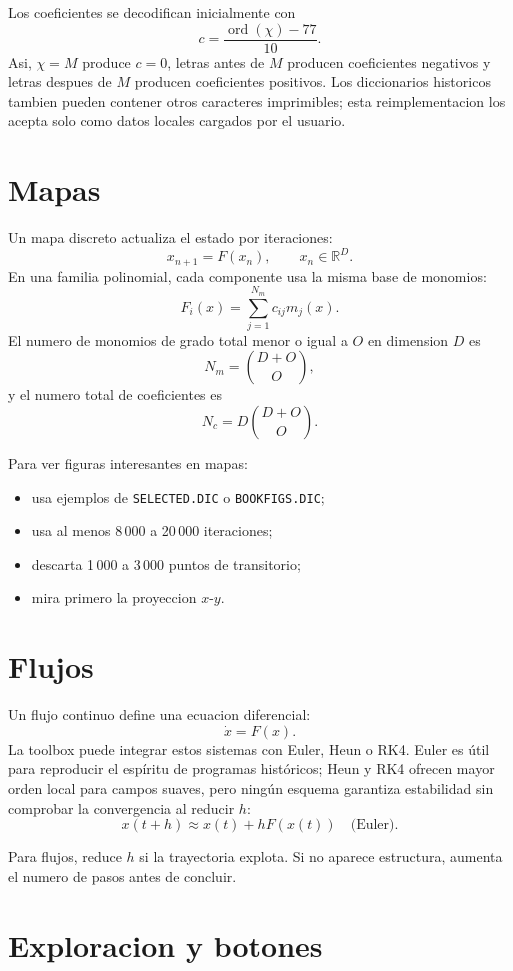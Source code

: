 \documentclass[11pt]{article}
\newcommand{\code}[1]{\texttt{#1}}
\newcommand{\R}{\mathbb{R}}
\begin{document}
Los coeficientes se decodifican inicialmente con
\[
c=\frac{\operatorname{ord}(\chi)-77}{10}.
\]
Asi, \(\chi=M\) produce \(c=0\), letras antes de \(M\) producen coeficientes negativos
y letras despues de \(M\) producen coeficientes positivos. Los diccionarios historicos
tambien pueden contener otros caracteres imprimibles; esta reimplementacion los acepta
solo como datos locales cargados por el usuario.

\section{Mapas}

Un mapa discreto actualiza el estado por iteraciones:
\[
x_{n+1}=F(x_n), \qquad x_n\in\R^D.
\]
En una familia polinomial, cada componente usa la misma base de monomios:
\[
F_i(x)=\sum_{j=1}^{N_m} c_{ij}m_j(x).
\]
El numero de monomios de grado total menor o igual a \(O\) en dimension \(D\) es
\[
N_m=\binom{D+O}{O},
\]
y el numero total de coeficientes es
\[
N_c=D\binom{D+O}{O}.
\]

Para ver figuras interesantes en mapas:
\begin{itemize}
  \item usa ejemplos de \code{SELECTED.DIC} o \code{BOOKFIGS.DIC};
  \item usa al menos 8\,000 a 20\,000 iteraciones;
  \item descarta 1\,000 a 3\,000 puntos de transitorio;
  \item mira primero la proyeccion \(x\)-\(y\).
\end{itemize}

\section{Flujos}

Un flujo continuo define una ecuacion diferencial:
\[
\dot{x}=F(x).
\]
La toolbox puede integrar estos sistemas con Euler, Heun o RK4. Euler es útil para reproducir
el espíritu de programas históricos; Heun y RK4 ofrecen mayor orden local para campos suaves,
pero ningún esquema garantiza estabilidad sin comprobar la convergencia al reducir \(h\):
\[
x(t+h)\approx x(t)+hF(x(t)) \quad \text{(Euler)}.
\]

Para flujos, reduce \(h\) si la trayectoria explota. Si no aparece estructura, aumenta
el numero de pasos antes de concluir.

\section{Exploracion y botones}
\end{document}
